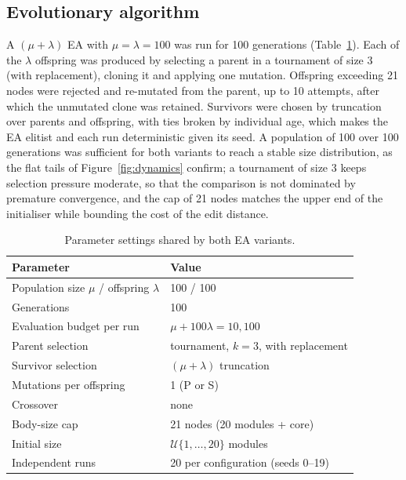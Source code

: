 \documentclass[sigconf]{acmart}
\begin{document}
\subsection{Evolutionary algorithm}
\label{sec:ea}
A $(\mu+\lambda)$ EA with $\mu = \lambda = 100$ was run for 100 generations (Table~\ref{tab:params}).
Each of the $\lambda$ offspring was produced by selecting a parent in a tournament of size 3 (with replacement), cloning it and applying one mutation.
Offspring exceeding 21 nodes were rejected and re-mutated from the parent, up to 10 attempts, after which the unmutated clone was retained.
Survivors were chosen by truncation over parents and offspring, with ties broken by individual age, which makes the EA elitist and each run deterministic given its seed.
A population of 100 over 100 generations was sufficient for both variants to reach a stable size distribution, as the flat tails of Figure~\ref{fig:dynamics} confirm; a tournament of size 3 keeps selection pressure moderate, so that the comparison is not dominated by premature convergence, and the cap of 21 nodes matches the upper end of the initialiser while bounding the cost of the edit distance.

\begin{table}[t]
  \caption{Parameter settings shared by both EA variants.}
  \label{tab:params}
  \small
  \centering
  \begin{tabular}{@{}ll@{}}
    \toprule
    Parameter & Value \\
    \midrule
    Population size $\mu$ / offspring $\lambda$ & 100 / 100 \\
    Generations & 100 \\
    Evaluation budget per run & $\mu + 100\lambda = 10{,}100$ \\
    Parent selection & tournament, $k = 3$, with replacement \\
    Survivor selection & $(\mu+\lambda)$ truncation \\
    Mutations per offspring & 1 (P or S) \\
    Crossover & none \\
    Body-size cap & 21 nodes (20 modules + core) \\
    Initial size & $\mathcal{U}\{1,\dots,20\}$ modules \\
    Independent runs & 20 per configuration (seeds 0--19) \\
    \bottomrule
  \end{tabular}
\end{table}
\end{document}
